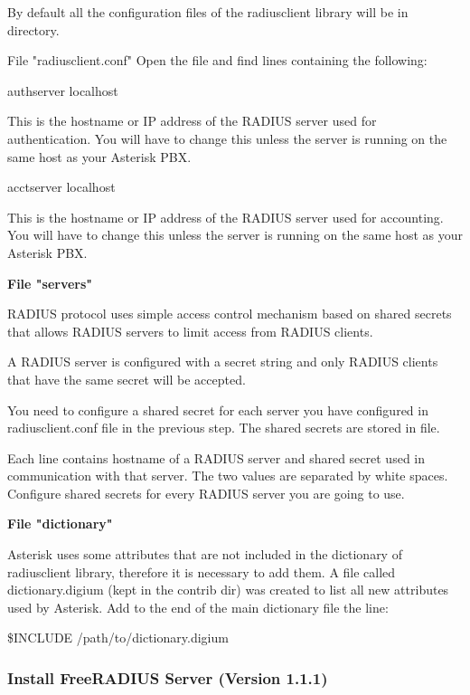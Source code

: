 	By default all the configuration files of the radiusclient library will
	be in  directory.
		
	File "radiusclient.conf"
		Open the file and find lines containing the following:

			authserver      localhost
	
	This is the hostname or IP address of the RADIUS server used for
	authentication. You will have to change this unless the server is
	running on the same host as your Asterisk PBX.

			acctserver      localhost

	This is the hostname or IP address of the RADIUS server used for
	accounting. You will have to change this unless the server is running
	on the same host as your Asterisk PBX.

	\textbf{File "servers"}
		
	RADIUS protocol uses simple access control mechanism based on shared
	secrets that allows RADIUS servers to limit access from RADIUS clients.
		
	A RADIUS server is configured with a secret string and only RADIUS
	clients that have the same secret will be accepted.

	You need to configure a shared secret for each server you have
	configured in radiusclient.conf file in the previous step. The shared
	secrets are stored in  file.

	Each line contains hostname of a RADIUS server and shared secret
	used in communication with that server. The two values are separated
	by white spaces. Configure shared secrets for every RADIUS server you
	are going to use.

	\textbf{File "dictionary"}
			
	Asterisk uses some attributes that are not included in the
	dictionary of radiusclient library, therefore it is necessary to add
	them. A file called dictionary.digium (kept in the contrib dir)
	was created to list all new attributes used by Asterisk.
	Add to the end of the main dictionary file
	 the line:

		\$INCLUDE /path/to/dictionary.digium

\subsubsection{Install FreeRADIUS Server (Version 1.1.1)}

